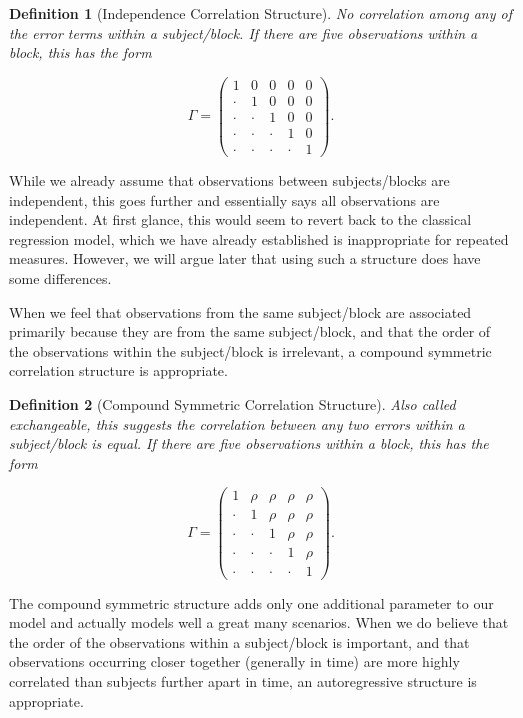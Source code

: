 \documentclass[
]{book}
\theoremstyle{plain}
\theoremstyle{mydefn}
\newtheorem{definition}{Definition}[chapter]
\theoremstyle{myexmpl}
\theoremstyle{remark}
\begin{document}
\begin{definition}[Independence Correlation Structure]
No correlation among any of the error terms within a subject/block. If there are five observations within a block, this has the form

\[\Gamma = \begin{pmatrix} 
1 & 0 & 0 & 0 & 0 \\
\cdot & 1 & 0 & 0 & 0 \\
\cdot & \cdot & 1 & 0 & 0 \\
\cdot & \cdot & \cdot & 1 & 0 \\
\cdot & \cdot & \cdot & \cdot & 1 \end{pmatrix}.\]
\end{definition}

While we already assume that observations between subjects/blocks are independent, this goes further and essentially says all observations are independent. At first glance, this would seem to revert back to the classical regression model, which we have already established is inappropriate for repeated measures. However, we will argue later that using such a structure does have some differences.

When we feel that observations from the same subject/block are associated primarily because they are from the same subject/block, and that the order of the observations within the subject/block is irrelevant, a compound symmetric correlation structure is appropriate.

\begin{definition}[Compound Symmetric Correlation Structure]
Also called \emph{exchangeable}, this suggests the correlation between any two errors within a subject/block is equal. If there are five observations within a block, this has the form

\[\Gamma = \begin{pmatrix} 
1 & \rho & \rho & \rho & \rho \\
\cdot & 1 & \rho & \rho & \rho \\
\cdot & \cdot & 1 & \rho & \rho \\
\cdot & \cdot & \cdot & 1 & \rho \\
\cdot & \cdot & \cdot & \cdot & 1 \end{pmatrix}.\]
\end{definition}

The compound symmetric structure adds only one additional parameter to our model and actually models well a great many scenarios. When we do believe that the order of the observations within a subject/block is important, and that observations occurring closer together (generally in time) are more highly correlated than subjects further apart in time, an autoregressive structure is appropriate.
\end{document}
